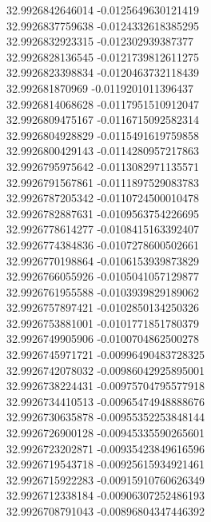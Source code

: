 {32.9926842646014	-0.0125649630121419\\
32.9926837759638	-0.0124332618385295\\
32.9926832923315	-0.012302939387377\\
32.9926828136545	-0.0121739812611275\\
32.9926823398834	-0.0120463732118439\\
32.992681870969	-0.0119201011396437\\
32.9926814068628	-0.0117951510912047\\
32.9926809475167	-0.0116715092582314\\
32.9926804928829	-0.0115491619759858\\
32.9926800429143	-0.0114280957217863\\
32.9926795975642	-0.0113082971135571\\
32.9926791567861	-0.0111897529083783\\
32.9926787205342	-0.0110724500010478\\
32.9926782887631	-0.0109563754226695\\
32.9926778614277	-0.0108415163392407\\
32.9926774384836	-0.0107278600502661\\
32.9926770198864	-0.0106153939873829\\
32.9926766055926	-0.0105041057129877\\
32.9926761955588	-0.0103939829189062\\
32.9926757897421	-0.0102850134250326\\
32.9926753881001	-0.0101771851780379\\
32.9926749905906	-0.0100704862500278\\
32.9926745971721	-0.00996490483728325\\
32.9926742078032	-0.00986042925895001\\
32.9926738224431	-0.00975704795577918\\
32.9926734410513	-0.00965474948888676\\
32.9926730635878	-0.00955352253848144\\
32.9926726900128	-0.00945335590265601\\
32.9926723202871	-0.00935423849616596\\
32.9926719543718	-0.00925615934921461\\
32.9926715922283	-0.00915910760626349\\
32.9926712338184	-0.00906307252486193\\
32.9926708791043	-0.00896804347446392\\
}
